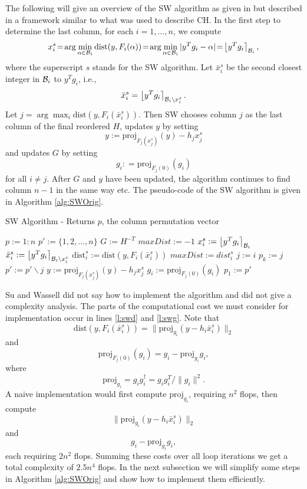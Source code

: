 \documentclass[12pt,Bold,letterpaper]{mcgilletdclass}
\newcommand{\be}{\begin{equation}}
\newcommand{\ee}{\end{equation}}
\newcommand{\dist}{\mathrm{dist}}
\begin{document}
The following will give an overview of the SW algorithm as given in
\cite{SuW05} but described in a framework similar to what was used to describe
CH. In the first step to determine the last column, for each $i = 1, \dots, n$,
we compute 
\be
x_i^s \!=\! \arg\min_{\alpha\in {\cal B}_i}\dist(y,F_i(\alpha)) 
\!=\!  \arg\min _{\alpha\in {\cal B}_i}| y^Tg_i - \alpha | \!=\! \left \lfloor y^Tg_i \right \rceil_{{\cal B}_i},
\label{eq:xis}
\ee
where the superscript $s$  stands for the SW algorithm.
Let $\bar{x}_i^s$ be the second closest integer in ${{\cal B}_i }$ to $y^Tg_i$, i.e.,
$$\bar{x}_i^s = \left \lfloor y^Tg_i \right \rceil_{{\cal B}_i\backslash x_i^s}.$$
Let $j = \arg\max_i  \dist (y,F_i(\bar{x}_i^s))$. 
Then SW chooses column $j$ as the last column of the final reordered $H$,
updates $y$ by setting 
$$y:=\mbox{proj}_{F_j(x_j^s)}(y) -h_jx_j^s$$  and 
updates $G$ by setting $$g_i: = \mbox{proj}_{F_j(0)}(g_i)$$ for all $i\neq j$. 
After $G$ and $y$ have been updated, the algorithm continues to find column $n-1$ in the
same way etc. The pseudo-code of the SW algorithm is given in Algorithm \ref{alg:SWOrig}.
\begin{algorithm}
\caption{SW Algorithm - Returns $p$, the column permutation vector}
\label{alg:SWOrig}
\begin{algorithmic}[1]
\STATE $p := 1:n$
\STATE $p' := \{1, 2, \ldots, n\}$
\STATE \label{l:swG} $G := H^{-T}$ \hfill %
	\STATE $maxDist := -1$
		\STATE $x_i^s := \left \lfloor  y^Tg_i \right \rceil_{{\cal B }_i}$ \hfill%
		     \label{l:swx}
		\STATE $\bar{x}_i^s := \left \lfloor y^Tg_i \right \rceil_{{{\cal B }_i}{\backslash x_i^s}}$
		    \label{l:swbx}
		\STATE  \label{l:swd} $\dist_i^s := \dist(y,F_i(\bar{x}_i^s))$ %
			\STATE $maxDist := dist_i^s$
			\STATE $j := i$
		\ENDIF
	\ENDFOR
	\STATE $p_k := j$
	\STATE $p' := p' \backslash j$
	\STATE $y := \mbox{proj}_{F_j(x_j^s)}(y) -h_jx_j^s$  \label{l:swy}
		\STATE \label{l:swg} $g_i := \mbox{proj}_{F_j(0)}(g_i) $ %
	\ENDFOR
\ENDFOR
\STATE $p_1 := p'$
\end{algorithmic}
\end{algorithm}

Su and Wassell did not say how to implement the algorithm and did not give a complexity analysis.
The parts of the computational cost we must consider for implementation occur in
lines \ref{l:swd} and \ref{l:swg}.
Note that $$\dist(y,F_i(\bar{x}_i^s))=\|\mbox{proj}_{g_i}(y-h_i\bar{x}_i^s)\|_2$$
and $$\mbox{proj}_{F_j(0)}(g_i)= g_i -\mbox{proj}_{g_i} g_i,$$
where $$\mbox{proj}_{g_i}=g_ig_i^\dag = g_ig_i^T/\|g_i\|^2.$$ 
A naive implementation would first compute $\mbox{proj}_{g_i}$, requiring $n^2$ flops, then compute 
$$\|\mbox{proj}_{g_i}(y-h_i\bar{x}_i^s)\|_2$$ and $$g_i -\mbox{proj}_{g_i} g_i,$$ each requiring $2n^2$ flops.
Summing these costs over all loop iterations we get a total complexity of $2.5n^4$ flops.
In the next subsection we will simplify some steps in Algorithm \ref{alg:SWOrig}
and show how to  implement them efficiently.
\end{document}
